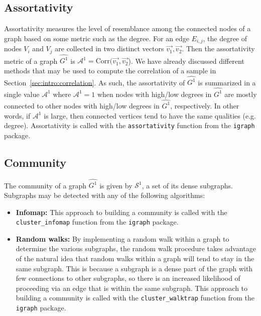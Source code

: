 \subsection{Assortativity}

Assortativity measures the level of resemblance among the connected nodes of a 
graph based on some metric such as the degree. For 
an edge $E_{i,j}$, the degree of nodes $V_i$ and $V_j$ are collected in two 
distinct vectors $\overrightarrow{v_1}, \overrightarrow{v_2}$. Then the 
assortativity metric of a graph $\hat{G^1}$ is $\mathcal{A}^1 = 
\text{Corr}(\overrightarrow{v_1},\overrightarrow{v_2}$). 
We have already discussed different methods that may be used to compute 
the correlation of a sample in Section~\ref{sec:intro:correlation}. As such, 
the assortativity of $\hat{G^1}$ is summarized in a single value 
$\mathcal{A}^1$ where $\mathcal{A}^1=1$ when nodes with high/low degrees in 
$\hat{G^1}$ are mostly connected to other nodes with high/low degrees in 
$\hat{G^1}$, respectively. In other words, if $\mathcal{A}^1$ is large, then 
connected vertices tend to have the same qualities (e.g. degree).
Assortativity is called with the \texttt{assortativity} function from the 
\texttt{igraph} package.

\subsection{Community}

The community of a graph $\hat{G^1}$ is given by $\mathcal{S}^1$, a set of its 
dense subgraphs. Subgraphs may be detected with any of the following algorithms:

\tablespacing
\begin{itemize}
	\item \textbf{Infomap:} 
	This approach to building a community is called with the 
	\texttt{cluster\_infomap} function from the \texttt{igraph} package.
	\item \textbf{Random walks:} By implementing a random walk within a graph 
	to determine the various subgraphs, the random walk procedure takes 
	advantage of the natural idea that random walks within a graph will tend to 
	stay in the same subgraph. This is because a subgraph is a dense part of 
	the graph with few connections to other subgraphs, so there is an 
	increased likelihood of proceeding via an edge that is within the same 
	subgraph.
	This approach to building a community is called with the 
	\texttt{cluster\_walktrap} function from the \texttt{igraph} package.
\end{itemize}
\bodyspacing

